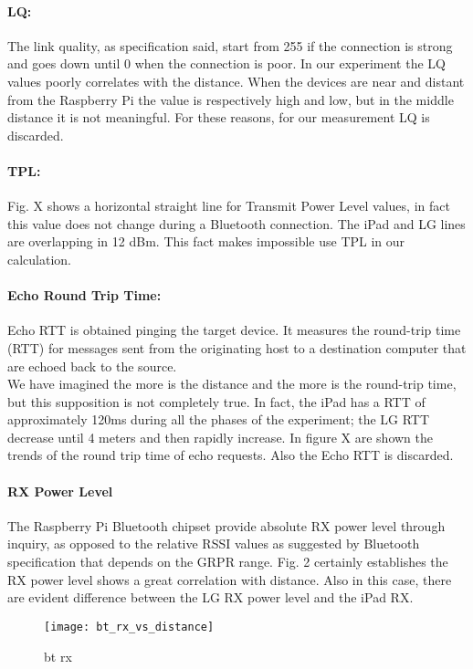 \paragraph{LQ:} The link quality, as specification said, start from 255 if the connection is strong and goes down until 0 when the connection is poor. In our experiment the LQ values poorly correlates with the distance. When the devices are near and distant from the Raspberry Pi the value is respectively high and low, but in the middle distance it is not meaningful. For these reasons, for our measurement LQ is discarded.
\paragraph{TPL:} 
Fig. X shows a horizontal straight line for Transmit Power Level values, in fact this value does not change during a Bluetooth connection. The iPad and LG lines are overlapping in 12 dBm. This fact makes impossible use TPL in our calculation.
\paragraph{Echo Round Trip Time:} Echo RTT is obtained pinging the target device. It measures the round-trip time (RTT) for messages sent from the originating host to a destination computer that are echoed back to the source.\\
We have imagined the more is the distance and the more is the round-trip time, but this supposition is not completely true. In fact, the iPad has a RTT of approximately 120ms during all the phases of the experiment; the LG RTT decrease until 4 meters and then rapidly increase. In figure X are shown the trends of the round trip time of echo requests. Also the Echo RTT is discarded.
\paragraph{RX Power Level}
The Raspberry Pi Bluetooth chipset provide absolute RX power level through inquiry, as opposed to the relative RSSI values as suggested by Bluetooth specification that depends on the GRPR range. Fig. 2 certainly establishes the RX power level shows a great correlation with distance. Also in this case, there are evident difference between the LG RX power level and the iPad RX.

\begin{figure}[H]
\centering
\texttt{[image: bt\_rx\_vs\_distance]}
\caption{bt rx}
\end{figure}

